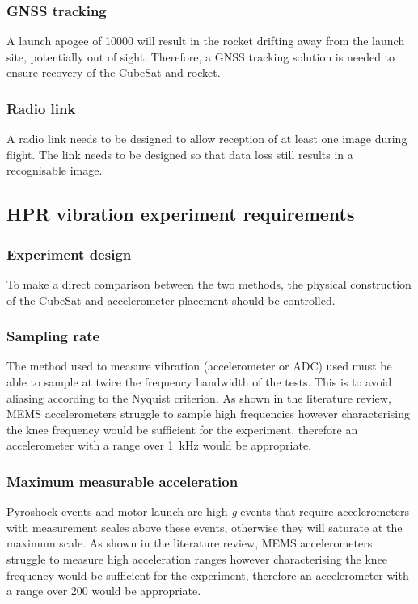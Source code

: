 \documentclass[]{report}
\begin{document}
\subsubsection{GNSS tracking}
A launch apogee of \SI{10000}{\feet} will result in the rocket drifting away from the launch site, potentially out of sight. Therefore, a GNSS tracking solution is needed to ensure recovery of the CubeSat and rocket.

\subsubsection{Radio link}
A radio link needs to be designed to allow reception of at least one image during flight. The link needs to be designed so that data loss still results in a recognisable image.

\subsection{HPR vibration experiment requirements}

\subsubsection{Experiment design} To make a direct comparison between the two methods, the physical construction of the CubeSat and accelerometer placement should be controlled.

\subsubsection{Sampling rate} The method used to measure vibration (accelerometer or ADC) used must be able to sample at twice the frequency bandwidth of the tests. This is to avoid aliasing according to the Nyquist criterion. As shown in the literature review, MEMS accelerometers struggle to sample high frequencies however characterising the knee frequency would be sufficient for the experiment, therefore an accelerometer with a range over \SI{1}{\kilo\hertz} would be appropriate.

\subsubsection{Maximum measurable acceleration} Pyroshock events and motor launch are high-\textit{g} events that require accelerometers with measurement scales above these events, otherwise they will saturate at the maximum scale.
As shown in the literature review, MEMS accelerometers struggle to measure high acceleration ranges however characterising the knee frequency would be sufficient for the experiment, therefore an accelerometer with a range over \SI{200}{\gacc} would be appropriate.
\end{document}
